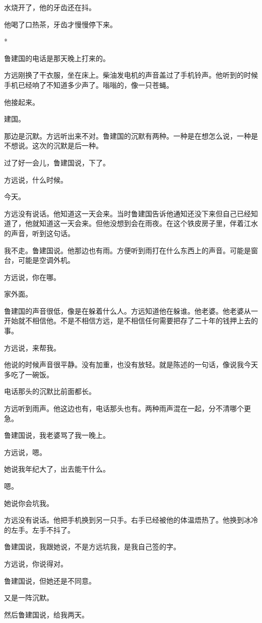 \documentclass[UTF8,a5paper,11pt,openany]{ctexbook}
\newcommand{\scene}{\vspace{1em}\begin{center}*\quad*\quad*\end{center}\vspace{0.5em}}
\begin{document}
水烧开了，他的牙齿还在抖。

他喝了口热茶，牙齿才慢慢停下来。


\scene

鲁建国的电话是那天晚上打来的。

方远刚换了干衣服，坐在床上。柴油发电机的声音盖过了手机铃声。他听到的时候手机已经响了不知道多少声了。嗡嗡的，像一只苍蝇。

他接起来。

建国。

那边是沉默。方远听出来不对。鲁建国的沉默有两种。一种是在想怎么说，一种是不想说。这次的沉默是后一种。

过了好一会儿，鲁建国说，下了。

方远说，什么时候。

今天。

方远没有说话。他知道这一天会来。当时鲁建国告诉他通知还没下来但自己已经知道了，他就知道这一天会来。但他没想到会在雨夜。在这个铁皮房子里，伴着江水的声音，听到这句话。

我不走。鲁建国说。他那边也有雨。方便听到雨打在什么东西上的声音。可能是窗台，可能是空调外机。

方远说，你在哪。

家外面。

鲁建国的声音很低，像是在躲着什么人。方远知道他在躲谁。他老婆。他老婆从一开始就不相信他。不是不相信方远，是不相信任何需要把存了二十年的钱押上去的事。

方远说，来帮我。

他说的时候声音很平静。没有加重，也没有放轻。就是陈述的一句话，像说我今天多吃了一碗饭。

电话那头的沉默比前面都长。

方远听到雨声。他这边也有，电话那头也有。两种雨声混在一起，分不清哪个更急。

鲁建国说，我老婆骂了我一晚上。

方远说，嗯。

她说我年纪大了，出去能干什么。

嗯。

她说你会坑我。

方远没有说话。他把手机换到另一只手。右手已经被他的体温焐热了。他换到冰冷的左手。左手不抖了。

鲁建国说，我跟她说，不是方远坑我，是我自己签的字。

方远说，你说得对。

鲁建国说，但她还是不同意。

又是一阵沉默。

然后鲁建国说，给我两天。
\end{document}

